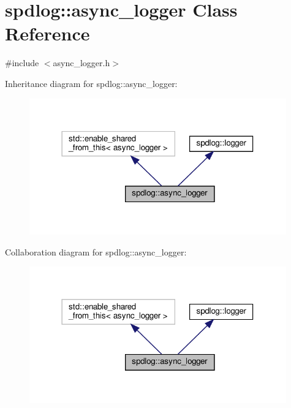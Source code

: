 \hypertarget{classspdlog_1_1async__logger}{}\section{spdlog\+:\+:async\+\_\+logger Class Reference}
\label{classspdlog_1_1async__logger}


{\ttfamily \#include $<$async\+\_\+logger.\+h$>$}



Inheritance diagram for spdlog\+:\+:async\+\_\+logger\+:
\nopagebreak
\begin{figure}[H]
\begin{center}
\leavevmode
\includegraphics[width=314pt]{classspdlog_1_1async__logger__inherit__graph}
\end{center}
\end{figure}


Collaboration diagram for spdlog\+:\+:async\+\_\+logger\+:
\nopagebreak
\begin{figure}[H]
\begin{center}
\leavevmode
\includegraphics[width=314pt]{classspdlog_1_1async__logger__coll__graph}
\end{center}
\end{figure}
